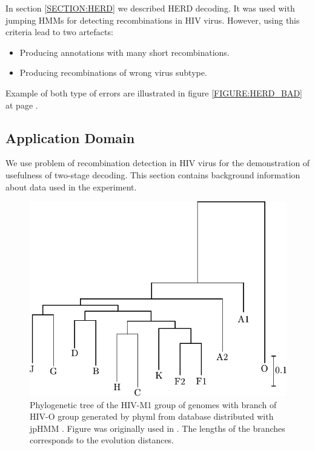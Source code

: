 In section \ref{SECTION:HERD} we described HERD decoding. It was used with
jumping HMMs \cite{Schultz2006} for detecting recombinations in HIV virus.
However, using this criteria lead to two artefacts: \begin{itemize} \item
Producing annotations with many short recombinations.  \item Producing
recombinations of wrong virus subtype.  \end{itemize} Example of both type of
errors are illustrated in figure \ref{FIGURE:HERD_BAD} at page
\pageref{FIGURE:HERD_BAD}.

\subsection{Application Domain}
We use problem of recombination detection in HIV virus for the demonstration of
usefulness of two-stage decoding.  This section contains background information
about data used in the experiment.

\begin{figure}
\begin{center}
\includegraphics{../figures/hiv_M1strom}
\end{center}
\caption[Phylogenetic tree of the HIV-M1 group]{Phylogenetic tree of the HIV-M1
group of genomes with branch of HIV-O group generated by phyml \cite{Guidon2003}
from database distributed with jpHMM \cite{Schultz2006}. Figure was originally
used in \cite{Nanasi2010mgr}. The lengths of the branches corresponds to the
evolution distances.  }\label{app:figure:phil}
\end{figure}

